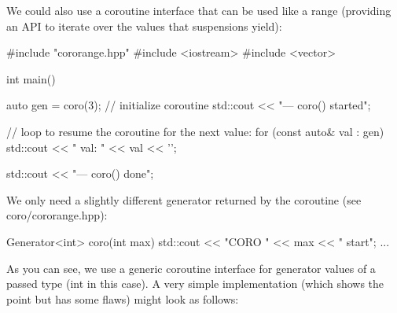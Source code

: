
We could also use a coroutine interface that can be used like a range (providing an API to iterate over the values that suspensions yield):


\begin{cpp}
#include "cororange.hpp"
#include <iostream>
#include <vector>

int main()
{
	auto gen = coro(3); // initialize coroutine
	std::cout << "--- coro() started\n";
	
	// loop to resume the coroutine for the next value:
	for (const auto& val : gen) {
		std::cout << " val: " << val << '\n';
	}
	
	std::cout << "--- coro() done\n";
}
\end{cpp}

We only need a slightly different generator returned by the coroutine (see coro/cororange.hpp):

\begin{cpp}
Generator<int> coro(int max)
{
	std::cout << "CORO " << max << " start\n";
	...
}
\end{cpp}

As you can see, we use a generic coroutine interface for generator values of a passed type (int in this case). A very simple implementation (which shows the point but has some flaws) might look as follows:


